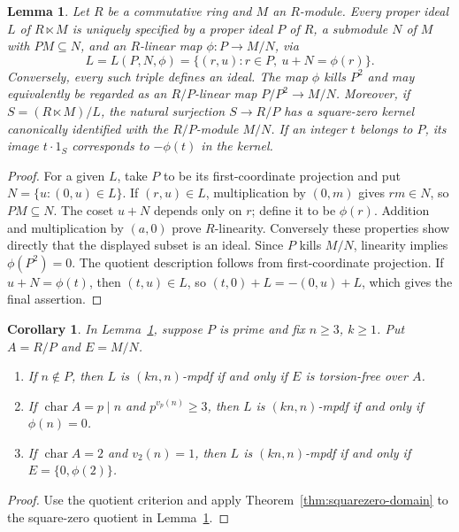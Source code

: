 \documentclass[11pt,a4paper]{amsart}
\newtheorem{lemma}[theorem]{Lemma}
\newtheorem{corollary}[theorem]{Corollary}
\theoremstyle{definition}
\theoremstyle{remark}
\numberwithin{equation}{section}
\begin{document}
\begin{lemma}\label{lem:compatible-idealization}
Let $R$ be a commutative ring and $M$ an $R$-module. Every proper ideal $L$ of
$R\ltimes M$ is uniquely specified by a proper ideal $P$ of $R$, a submodule
$N$ of $M$ with $PM\subseteq N$, and an $R$-linear map
$\phi:P\to M/N$, via
\[
 L=L(P,N,\phi)=\{(r,u):r\in P,\ u+N=\phi(r)\}.
\]
Conversely, every such triple defines an ideal. The map $\phi$ kills
$P^2$ and may equivalently be regarded as an $R/P$-linear map
$P/P^2\to M/N$. Moreover, if $S=(R\ltimes M)/L$, the natural
surjection $S\to R/P$ has a square-zero kernel canonically identified
with the $R/P$-module $M/N$. If an integer $t$ belongs to $P$, its image
$t\cdot1_S$ corresponds to $-\phi(t)$ in the kernel.
\end{lemma}
\begin{proof}
For a given $L$, take $P$ to be its first-coordinate projection and put
$N=\{u:(0,u)\in L\}$. If $(r,u)\in L$, multiplication by $(0,m)$ gives
$rm\in N$, so $PM\subseteq N$. The coset $u+N$ depends only on $r$;
define it to be $\phi(r)$. Addition and multiplication by $(a,0)$ prove
$R$-linearity. Conversely these properties show directly that the
displayed subset is an ideal. Since $P$ kills $M/N$, linearity implies
$\phi(P^2)=0$. The quotient description follows from first-coordinate
projection. If $u+N=\phi(t)$, then $(t,u)\in L$, so
$(t,0)+L=-(0,u)+L$, which gives the final assertion.
\end{proof}

\begin{corollary}\label{cor:arbitrary-idealization-mpdf}
In Lemma~\ref{lem:compatible-idealization}, suppose $P$ is prime and fix
$n\geq3$, $k\geq1$. Put $A=R/P$ and $E=M/N$.
\begin{enumerate}
\item If $n\notin P$, then $L$ is $(kn,n)$-mpdf if and only if $E$ is
torsion-free over $A$.
\item If $\operatorname{char}A=p\mid n$ and $p^{v_p(n)}\geq3$, then $L$
is $(kn,n)$-mpdf if and only if $\phi(n)=0$.
\item If $\operatorname{char}A=2$ and $v_2(n)=1$, then $L$ is
$(kn,n)$-mpdf if and only if $E=\{0,\phi(2)\}$.
\end{enumerate}
\end{corollary}
\begin{proof}
Use the quotient criterion and apply Theorem~\ref{thm:squarezero-domain}
to the square-zero quotient in Lemma~\ref{lem:compatible-idealization}.
\end{proof}
\end{document}
